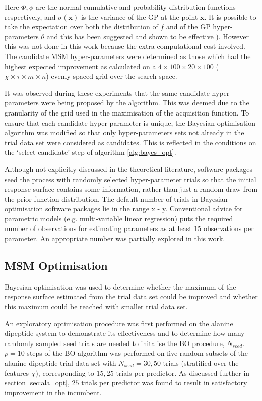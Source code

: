 Here $\Phi, \phi$ are the normal cumulative and probability distribution functions respectively, and $\sigma(\mathbf{x})$ is the variance of the GP at the point $\mathbf{x}$. It is possible to take the expectation over both the distribution of $f$ and of the GP hyper-parameters $\theta$ and this has been suggested and shown to be effective \cite{NIPS2012_4522}). However this was not done in this work because the extra computational cost involved. The candidate MSM hyper-parameters were determined as those which had the highest expected improvement as calculated on a $4 \times 100 \times 20 \times 100$ ($\chi \times \tau \times m \times n$) evenly spaced grid over the search space.

It was observed during these experiments that the same candidate hyper-parameters were being proposed by the algorithm. This was deemed due to the granularity of the grid used in the maximisation of the acquisition function. To ensure that each candidate hyper-parameter is unique, the Bayesian optimisation algorithm was modified so that only  hyper-parameters sets not already in the trial data set were considered as candidates. This is reflected in the conditions on the `select candidate' step of algorithm \ref{alg:bayes_opt}.

Although not explicitly discussed in the theoretical literature, software packages seed the process with randomly selected hyper-parameter trials so that the initial response surface contains some information, rather than just a random draw from the prior function distribution. The default number of trials in Bayesian optimisation software packages lie in the range x - y. Conventional advice \cite{harrelRegressionModelingStrategies2015} for parametric models (e.g. multi-variable linear regression) puts the required number of observations for estimating parameters as at least $15$ observations per parameter. An appropriate number was partially explored in this work. 

\subsection{MSM Optimisation}
Bayesian optimisation was used to determine whether the maximum of the response surface estimated from the trial data set could be improved and whether this maximum could be reached with smaller trial data set.

An exploratory optimisation procedure was first performed on the alanine dipeptide system to demonstrate its effectiveness and to determine how many randomly sampled seed trials are needed to initalise the BO procedure, $N_{seed}$. $p=10$ steps of the BO algorithm was performed on five random subsets of the alanine dipeptide trial data set with $N_{seed}=30, 50$ trials (stratified over the features $\chi$), corresponding to $15, 25$ trials per predictor. As discussed further in section \ref{sec:ala_opt}, $25$ trials per predictor was found to result in satisfactory improvement in the incumbent.  

